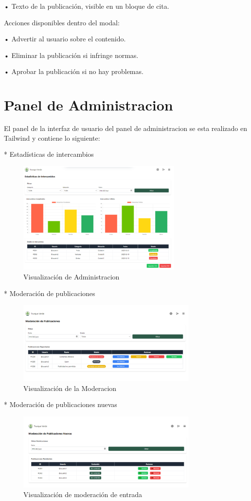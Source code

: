 \documentclass[11pt, a4paper, oneside]{book}
\begin{document}
• Texto de la publicación, visible en un bloque de cita.

Acciones disponibles dentro del modal:

• Advertir al usuario sobre el contenido.

• Eliminar la publicación si infringe normas.

• Aprobar la publicación si no hay problemas.

\section{Panel de Administracion}     

El panel de la interfaz de usuario del panel de administracion se esta realizado en Tailwind y contiene lo siguiente: 

* Estadísticas de intercambios
\begin{figure}[H]
\centering
\includegraphics[width=0.73\textwidth]{Pictures/Imagen 8.png}
\caption{Visualización de Administracion}
\end{figure}
* Moderación de publicaciones
\begin{figure}[H]
\centering
\includegraphics[width=0.8\textwidth]{Pictures/Imagen 9.png}
\caption{Visualización de la Moderacion}
\end{figure}
* Moderación de publicaciones nuevas
\begin{figure}[H]
\centering
\includegraphics[width=0.8\textwidth]{Pictures/Imagen 10.png}
\caption{Visualización de moderación de entrada}
\end{figure}
\end{document}

